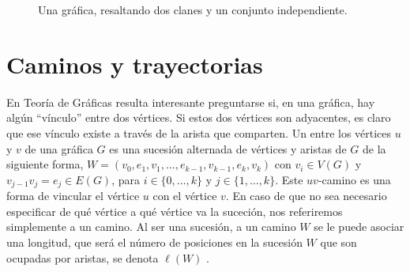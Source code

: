 \begin{figure}[ht!]
    \centering
    \caption{Una gr\'afica, resaltando dos clanes y un conjunto independiente.}
    \label{fig:ClanInd}
\end{figure}


\section{Caminos y trayectorias}
\label{sec:Caminos}


    En Teor\'ia de Gr\'aficas resulta interesante preguntarse si, en una
    gr\'afica, hay alg\'un ``v\'inculo'' entre dos v\'ertices. Si estos dos
    v\'ertices son adyacentes, es claro que ese v\'inculo existe a trav\'es de
    la arista que comparten. Un  entre los v\'ertices $u$ y
    $v$ de una gr\'afica $G$ es una sucesi\'on alternada de v\'ertices y aristas
    de $G$ de la siguiente forma, $W=(v_0, e_1,v_1, \dots, e_{k-1},v_{k-1},
    e_k,v_k)$ con $v_i \in V(G)$ y $v_{j-1}v_j = e_j \in E(G)$, para $i \in \{0,
    \dots, k\}$ y $j \in \{ 1, \dots, k\}$. Este $uv$-camino es una forma de
    vincular el v\'ertice $u$ con el v\'ertice $v$. En caso de que no sea
    necesario especificar de qu\'e v\'ertice a qu\'e v\'ertice va la suceci\'on,
    nos referiremos simplemente a un camino. Al ser una sucesi\'on, a un camino
    $W$ se le puede asociar una longitud, que ser\'a el n\'umero de posiciones
    en la sucesi\'on $W$ que son ocupadas por aristas, se denota $\ell(W)$ . 
    
